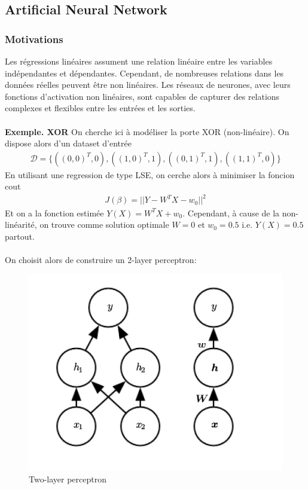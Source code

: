 \documentclass[a4paper]{article}
\begin{document}
\subsection{Artificial Neural Network}
\subsubsection{Motivations}
Les régressions linéaires assument une relation linéaire entre les variables indépendantes et dépendantes. Cependant, de nombreuses relations dans les données réelles peuvent être non linéaires. Les réseaux de neurones, avec leurs fonctions d'activation non linéaires, sont capables de capturer des relations complexes et flexibles entre les entrées et les sorties.
\\
\vspace{0.5mm}
\\
\textbf{Exemple. XOR} On cherche ici à modéliser la porte XOR (non-linéaire). On dispose alors d'un dataset d'entrée
\begin{align*}
    \mathcal{D} = \bigg\{ ((0,0)^T, 0), ((1,0)^T, 1), ((0,1)^T, 1), ((1,1)^T, 0) \bigg\}
\end{align*}
En utilisant une regression de type LSE, on cerche alors à minimiser la foncion cout
\begin{align*}
    J(\beta) = ||Y-W^T X - w_0||^2
\end{align*}
Et on a la fonction estimée $Y(X)= W^T X + w_0$. Cependant, à cause de la non-linéarité, on trouve comme solution optimale $W=0$ et $w_0=0.5$ i.e. $Y(X)=0.5$ partout.
\\
\vspace{1mm}
\\
On choisit alors de construire un 2-layer perceptron:
\begin{figure}[H]
    \centering
    \includegraphics[scale=0.7]{figures/2-layer.png}
    \caption{Two-layer perceptron}
    \label{fig:enter-label}
\end{figure}
\end{document}
